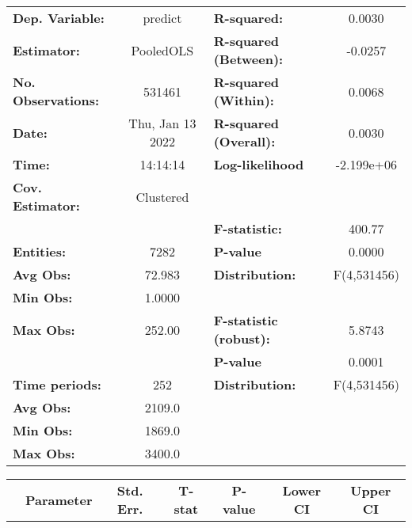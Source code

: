 \begin{center}
\begin{tabular}{lclc}
\toprule
\textbf{Dep. Variable:}    &      predict       & \textbf{  R-squared:         }   &      0.0030      \\
\textbf{Estimator:}        &     PooledOLS      & \textbf{  R-squared (Between):}  &     -0.0257      \\
\textbf{No. Observations:} &       531461       & \textbf{  R-squared (Within):}   &      0.0068      \\
\textbf{Date:}             &  Thu, Jan 13 2022  & \textbf{  R-squared (Overall):}  &      0.0030      \\
\textbf{Time:}             &      14:14:14      & \textbf{  Log-likelihood     }   &    -2.199e+06    \\
\textbf{Cov. Estimator:}   &     Clustered      & \textbf{                     }   &                  \\
\textbf{}                  &                    & \textbf{  F-statistic:       }   &      400.77      \\
\textbf{Entities:}         &        7282        & \textbf{  P-value            }   &      0.0000      \\
\textbf{Avg Obs:}          &       72.983       & \textbf{  Distribution:      }   &   F(4,531456)    \\
\textbf{Min Obs:}          &       1.0000       & \textbf{                     }   &                  \\
\textbf{Max Obs:}          &       252.00       & \textbf{  F-statistic (robust):} &      5.8743      \\
\textbf{}                  &                    & \textbf{  P-value            }   &      0.0001      \\
\textbf{Time periods:}     &        252         & \textbf{  Distribution:      }   &   F(4,531456)    \\
\textbf{Avg Obs:}          &       2109.0       & \textbf{                     }   &                  \\
\textbf{Min Obs:}          &       1869.0       & \textbf{                     }   &                  \\
\textbf{Max Obs:}          &       3400.0       & \textbf{                     }   &                  \\
\bottomrule
\end{tabular}
\begin{tabular}{lcccccc}
                & \textbf{Parameter} & \textbf{Std. Err.} & \textbf{T-stat} & \textbf{P-value} & \textbf{Lower CI} & \textbf{Upper CI}  \\

\end{tabular}
\end{center}
